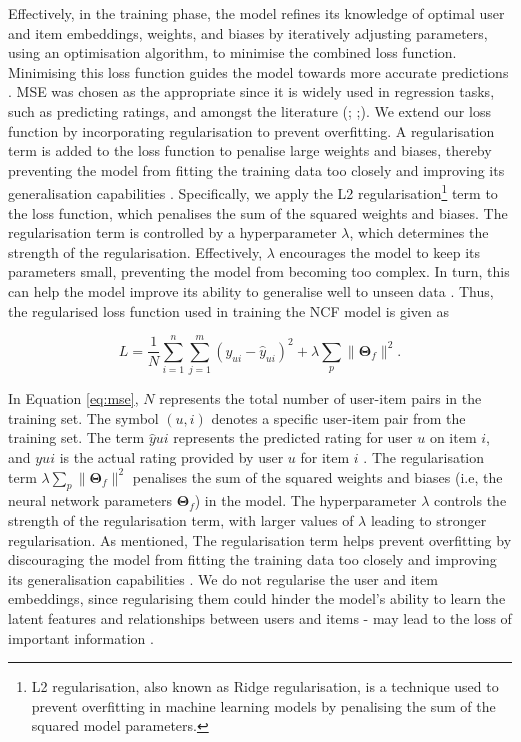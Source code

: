 Effectively, in the training phase, the model refines its knowledge of optimal user and item embeddings, weights, and biases by iteratively adjusting parameters, using an optimisation algorithm, to minimise the combined loss function. Minimising this loss function guides the model towards more accurate predictions \cite{abdi1999neural}. MSE was chosen as the appropriate since it is widely used in regression tasks, such as predicting ratings, and amongst the literature (\cite{abdi1999neural}; \cite{gurney2018introduction};\cite{paradarami2017hybrid}). We extend our loss function by incorporating regularisation to prevent overfitting. A regularisation term is added to the loss function to penalise large weights and biases, thereby preventing the model from fitting the training data too closely and improving its generalisation capabilities \cite{gurney2018introduction}. Specifically, we apply the L2 regularisation\footnote{L2 regularisation, also known as Ridge regularisation, is a technique used to prevent overfitting in machine learning models by penalising the sum of the squared model parameters.} term to the loss function, which penalises the sum of the squared weights and biases. The regularisation term is controlled by a hyperparameter $\lambda$, which determines the strength of the regularisation. Effectively, $\lambda$ encourages the model to keep its parameters small, preventing the model from becoming too complex. In turn, this can help the model improve its ability to generalise well to unseen data \cite{gurney2018introduction}. Thus, the regularised loss function used in training the NCF model is given as


\begin{equation}
    \label{eq:mse}
    L = \frac{1}{N} \sum_{i=1}^{n} \sum_{j=1}^{m} (y_{ui} - \hat{y}_{ui})^2 + \lambda \sum_{p} \|\boldsymbol{\Theta}_f\|^2.
\end{equation}


In Equation \ref{eq:mse}, $N$ represents the total number of user-item pairs in the training set. The symbol $(u,i)$ denotes a specific user-item pair from the training set. The term $\hat{y}{ui}$ represents the predicted rating for user $u$ on item $i$, and $y{ui}$ is the actual rating provided by user $u$ for item $i$ \cite{he2017neural}. The regularisation term $\lambda \sum_{p} \|\boldsymbol{\Theta}_f\|^2$ penalises the sum of the squared weights and biases (i.e, the neural network parameters $\boldsymbol{\Theta}_f$) in the model. The hyperparameter $\lambda$ controls the strength of the regularisation term, with larger values of $\lambda$ leading to stronger regularisation. As mentioned, The regularisation term helps prevent overfitting by discouraging the model from fitting the training data too closely and improving its generalisation capabilities \cite{gurney2018introduction}. We do not regularise the user and item embeddings, since regularising them could hinder the model's ability to learn the latent features and relationships between users and items - may lead to the loss of important information \cite{he2017neural}. 

